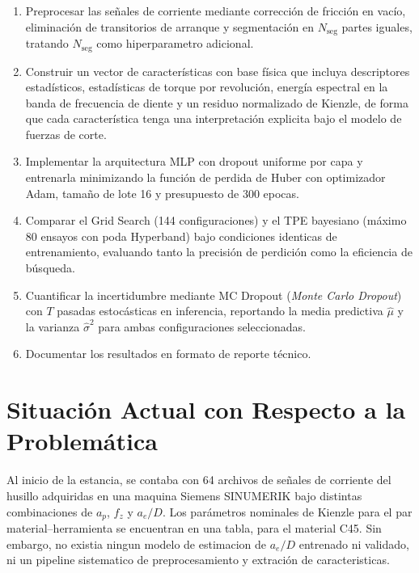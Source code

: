 \documentclass[12pt, letterpaper]{article}
\begin{document}
\begin{enumerate}[label=\arabic*.]
  \item Preprocesar las señales de corriente mediante corrección de fricción en vacío, eliminación de transitorios de arranque y segmentación en $N_{\text{seg}}$ partes iguales, tratando $N_{\text{seg}}$ como hiperparametro adicional.
  \item Construir un vector de características con base física que incluya descriptores estadísticos, estadísticas de torque por revolución, energía espectral en la banda de frecuencia de diente y un residuo normalizado de Kienzle, de forma que cada característica tenga una interpretación explicita bajo el modelo de fuerzas de corte.
  \item Implementar la arquitectura MLP con dropout uniforme por capa y entrenarla minimizando la función de perdida de Huber con optimizador Adam, tamaño de lote 16 y presupuesto de 300 epocas.
  \item Comparar el Grid Search (144 configuraciones) y el TPE bayesiano (máximo 80 ensayos con poda Hyperband) bajo condiciones identicas de entrenamiento, evaluando tanto la precisión de perdición como la eficiencia de búsqueda.
  \item Cuantificar la incertidumbre mediante MC Dropout (\textit{Monte Carlo Dropout}) con $T$ pasadas estocásticas en inferencia, reportando la media predictiva $\hat{\mu}$ y la varianza $\hat{\sigma}^2$ para ambas configuraciones seleccionadas.
  \item Documentar los resultados en formato de reporte técnico.
\end{enumerate}

\section{Situación Actual con Respecto a la Problemática}

Al inicio de la estancia, se contaba con 64 archivos de señales de corriente del husillo adquiridas en una maquina Siemens SINUMERIK bajo distintas combinaciones de $a_p$, $f_z$ y $a_e/D$. Los parámetros nominales de Kienzle para el par material--herramienta se encuentran en una tabla, \cite{MachiningDoctorKc} para el material C45. Sin embargo, no existia ningun modelo de estimacion de $a_e/D$ entrenado ni validado, ni un pipeline sistematico de preprocesamiento y extración de caracteristicas.
\end{document}
